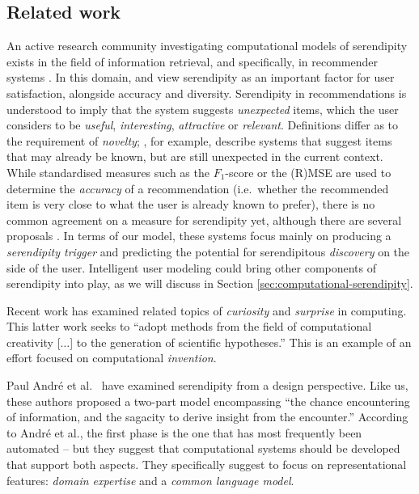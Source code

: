 \subsection{Related work} \label{sec:related}

An active research community investigating computational models of serendipity exists in the field of information retrieval, and specifically, in recommender systems \cite{Toms2000}. In this domain,  and  view serendipity as an important factor for user satisfaction, alongside accuracy and diversity.  Serendipity in recommendations is
understood to imply that the system suggests \emph{unexpected} items, which the user considers to be \emph{useful}, \emph{interesting}, \emph{attractive} or \emph{relevant}. 
Definitions differ as to the requirement of \emph{novelty}; , for example, describe systems that suggest items that may already be known, but are still unexpected in the current context.  While standardised measures such as the $F_1$-score or the (R)MSE are used to determine the \emph{accuracy} of a recommendation (i.e.~whether the recommended item is very close to what the user is already known to prefer), there is no common agreement on a measure for serendipity yet, although there are several proposals \cite{Murakami2008, Adamopoulos2011, McCay-Peet2011,iaquinta2010can}.
In terms of our model, these systems focus mainly on producing a \emph{serendipity trigger} and predicting the potential for serendipitous \emph{discovery} on the side of the user.  Intelligent user modeling could bring other components of serendipity into play, as we will discuss in Section \ref{sec:computational-serendipity}.

Recent work has examined related topics of \emph{curiosity}
\cite{wu2013curiosity} and \emph{surprise} \cite{grace2014using} in
computing.  This latter work seeks to ``adopt methods from the field
of computational creativity [$\ldots$] to the generation of scientific
hypotheses.''  This is an example of an effort focused on
computational \emph{invention}.

Paul Andr{\'e} et al.~\citeyear{andre2009discovery} have examined
serendipity from a design perspective.  Like us, these authors
proposed a two-part model encompassing ``the chance encountering of
information, and the sagacity to derive insight from the encounter.''
According to Andr\'e et al., the first phase is the one that has most
frequently been automated -- but they suggest that computational
systems should be developed that support both aspects.  They
specifically suggest to focus on representational features:
\emph{domain expertise} and a \emph{common language model}.

